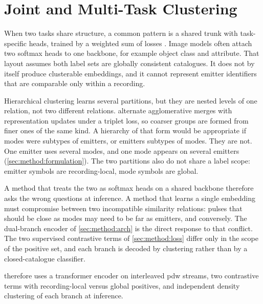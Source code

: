 \section{Joint and Multi-Task Clustering}\label{sec:related:joint}

When two tasks share structure, a common pattern is a shared trunk with task-specific heads, trained by a weighted sum of losses \parencite{caruana1997multitask}.
Image models often attach two softmax heads to one backbone, for example object class and attribute.
That layout assumes both label sets are globally consistent catalogues.
It does not by itself produce clusterable embeddings, and it cannot represent emitter identifiers that are comparable only within a recording.

Hierarchical clustering learns several partitions, but they are nested levels of one relation, not two different relations.
\textcite{yang2016jule} alternate agglomerative merges with representation updates under a triplet loss, so coarser groups are formed from finer ones of the same kind.
A hierarchy of that form would be appropriate if modes were subtypes of emitters, or emitters subtypes of modes.
They are not.
One emitter uses several modes, and one mode appears on several emitters (\cref{sec:method:formulation}).
The two partitions also do not share a label scope: emitter symbols are recording-local, mode symbols are global.

A method that treats the two as softmax heads on a shared backbone therefore asks the wrong questions at inference.
A method that learns a single embedding must compromise between two incompatible similarity relations: pulses that should be close as modes may need to be far as emitters, and conversely.
The dual-branch encoder of \cref{sec:method:arch} is the direct response to that conflict.
The two supervised contrastive terms of \cref{sec:method:loss} differ only in the scope of the positive set, and each branch is decoded by clustering rather than by a closed-catalogue classifier.

 therefore uses a transformer encoder on interleaved \gls{pdw} streams, two contrastive terms with recording-local versus global positives, and independent density clustering of each branch at inference.

